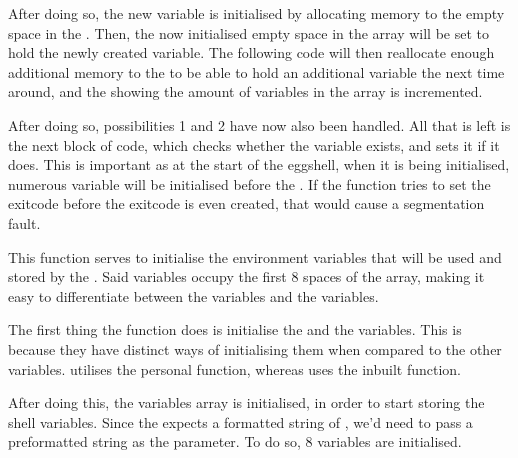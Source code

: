 \documentclass[12pt, a4paper]{report}
\begin{document}
                After doing so, the new variable is initialised by allocating memory to the 
                empty space in the . Then, the now initialised
                empty space in the array will be set to hold the newly created variable.
                The following code will then reallocate enough additional memory to the
                 to be able to hold an additional variable the next time
                around, and the  showing the amount of variables in the
                array is incremented.

                After doing so, possibilities 1 and 2 have now also been handled.
                All that is left is the next block of code, which checks whether the 
                 variable exists, and sets it if it does. This is
                important as at the start of the eggshell, when it is being initialised,
                numerous variable will be initialised before the . If the 
                function tries to set the exitcode before the exitcode is even created,
                that would cause a segmentation fault.
                \clearpage
            
                This function serves to initialise the environment variables that
                will be used and stored by the . Said variables occupy
                the first 8 spaces of the  array, making it easy to
                differentiate between the  variables and the 
                 variables.

                The first thing the function does is initialise the  and 
                the  variables. This is because they have distinct ways of
                initialising them when compared to the other variables. 
                 utilises the personal  function, whereas
                 uses the inbuilt  function.

                After doing this, the variables array is initialised, in order to start
                storing the shell variables. Since the  expects a formatted
                string of , we'd need to pass a preformatted string
                as the parameter. To do so, 8 variables are initialised.
\end{document}
